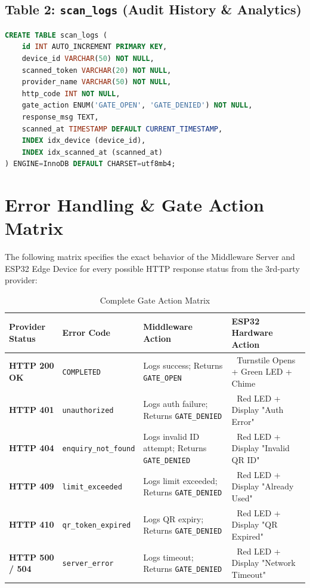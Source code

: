 \documentclass[12pt,a4paper]{article}
\begin{document}
\subsection{Table 2: \texttt{scan\_logs} (Audit History \& Analytics)}

\begin{lstlisting}[language=SQL, caption={DDL Statement for scan\_logs Table}]
CREATE TABLE scan_logs (
    id INT AUTO_INCREMENT PRIMARY KEY,
    device_id VARCHAR(50) NOT NULL,
    scanned_token VARCHAR(20) NOT NULL,
    provider_name VARCHAR(50) NOT NULL,
    http_code INT NOT NULL,
    gate_action ENUM('GATE_OPEN', 'GATE_DENIED') NOT NULL,
    response_msg TEXT,
    scanned_at TIMESTAMP DEFAULT CURRENT_TIMESTAMP,
    INDEX idx_device (device_id),
    INDEX idx_scanned_at (scanned_at)
) ENGINE=InnoDB DEFAULT CHARSET=utf8mb4;
\end{lstlisting}

\section{Error Handling \& Gate Action Matrix}

The following matrix specifies the exact behavior of the Middleware Server and ESP32 Edge Device for every possible HTTP response status from the 3rd-party provider:

\begin{table}[h!]
\centering
\small
\begin{tabular}{|m{2.2cm}|m{2.5cm}|m{4.5cm}|m{3.5cm}|}
\hline
\textbf{Provider Status} & \textbf{Error Code} & \textbf{Middleware Action} & \textbf{ESP32 Hardware Action} \\ \hline
\textbf{HTTP 200 OK} & \texttt{COMPLETED} & Logs success; Returns \texttt{GATE\_OPEN} & 🚪 Turnstile Opens + Green LED + Chime \\ \hline
\textbf{HTTP 401} & \texttt{unauthorized} & Logs auth failure; Returns \texttt{GATE\_DENIED} & 🔴 Red LED + Display "Auth Error" \\ \hline
\textbf{HTTP 404} & \texttt{enquiry\_not\_found} & Logs invalid ID attempt; Returns \texttt{GATE\_DENIED} & 🔴 Red LED + Display "Invalid QR ID" \\ \hline
\textbf{HTTP 409} & \texttt{limit\_exceeded} & Logs limit exceeded; Returns \texttt{GATE\_DENIED} & 🔴 Red LED + Display "Already Used" \\ \hline
\textbf{HTTP 410} & \texttt{qr\_token\_expired} & Logs QR expiry; Returns \texttt{GATE\_DENIED} & 🔴 Red LED + Display "QR Expired" \\ \hline
\textbf{HTTP 500 / 504} & \texttt{server\_error} & Logs timeout; Returns \texttt{GATE\_DENIED} & 🔴 Red LED + Display "Network Timeout" \\ \hline
\end{tabular}
\caption{Complete Gate Action Matrix}
\end{table}
\end{document}
